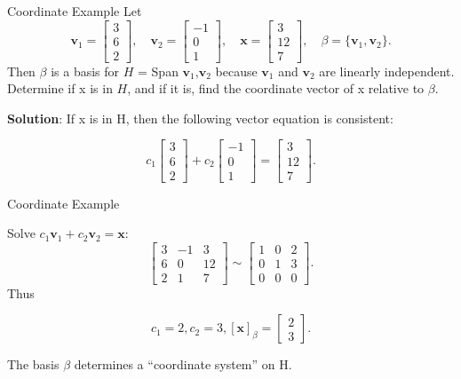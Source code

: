 \documentclass[aspectratio=169]{beamer}
\newcommand{\vect}[1]{\mathbf{#1}}
\begin{document}
\begin{frame}{Coordinate Example}
Let
\[
\vect v_1=\begin{bmatrix}3\\6\\2\end{bmatrix},
\quad
\vect v_2=\begin{bmatrix}-1\\0\\1\end{bmatrix},
\quad
\vect x=\begin{bmatrix}3\\12\\7\end{bmatrix},
\quad
\beta=\{\vect v_1,\vect v_2\}.
\]
Then $\beta$ is a basis for $H$ = Span {$\vect v_1$,$\vect v_2$} because $\vect v_1$ and $\vect v_2$ are linearly independent. Determine if x is in $H$, and if it is, find the coordinate vector of x relative to $\beta$.

\textbf{Solution}: If x is in H, then the following vector equation is consistent: 

\[
c_1 \left[\begin{array}{c}3\\6\\2\end{array}\right]+ c_2 \left[\begin{array}{c}-1\\0\\1\end{array}\right]
=
\left[\begin{array}{c}3\\12\\7\end{array}\right].
\]
\end{frame}
\begin{frame}{Coordinate Example}

Solve $c_1\vect v_1+c_2\vect v_2=\vect x$:
\[
\left[\begin{array}{cc|c}3&-1&3\\6&0&12\\2&1&7\end{array}\right]
\sim
\left[\begin{array}{cc|c}1&0&2\\0&1&3\\0&0&0\end{array}\right].
\]
Thus

\[
c_1=2, c_2=3, \boxed{[\vect x]_\beta=\begin{bmatrix}2\\3\end{bmatrix}}.
\]

The basis $\beta$ determines a ``coordinate system'' on H.
\end{frame}
\end{document}
